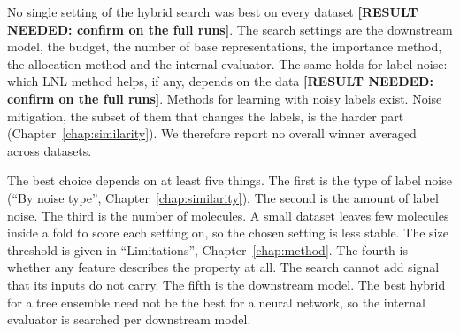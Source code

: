 
No single setting of the hybrid search was best on every dataset \textbf{[RESULT NEEDED: confirm on the full runs]}. The search settings are the downstream model, the budget, the number of base representations, the importance method, the allocation method and the internal evaluator. The same holds for label noise: which LNL method helps, if any, depends on the data \textbf{[RESULT NEEDED: confirm on the full runs]}. Methods for learning with noisy labels exist. Noise mitigation, the subset of them that changes the labels, is the harder part (Chapter~\ref{chap:similarity}). We therefore report no overall winner averaged across datasets.

The best choice depends on at least five things. The first is the type of label noise (``By noise type'', Chapter~\ref{chap:similarity}). The second is the amount of label noise. The third is the number of molecules. A small dataset leaves few molecules inside a fold to score each setting on, so the chosen setting is less stable. The size threshold is given in ``Limitations'', Chapter~\ref{chap:method}. The fourth is whether any feature describes the property at all. The search cannot add signal that its inputs do not carry. The fifth is the downstream model. The best hybrid for a tree ensemble need not be the best for a neural network, so the internal evaluator is searched per downstream model.

